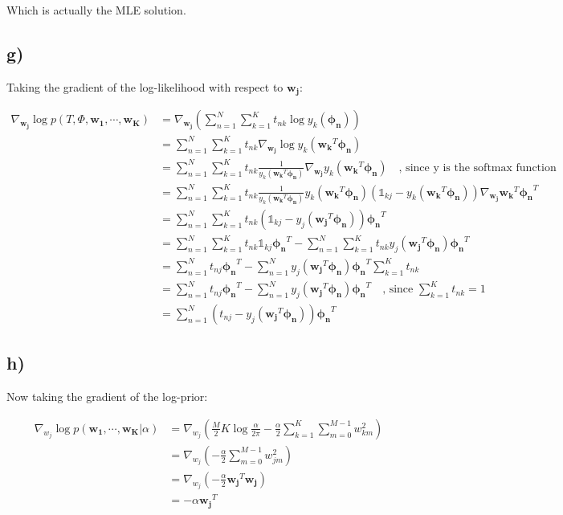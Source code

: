\documentclass[12pt,a4paper,oneside]{paper}
\begin{document}
Which is actually the MLE solution. 

\newpage
\subsection*{g)}

Taking the gradient of the log-likelihood with respect to $\bm{w_j}$:

\begin{align*}
    \nabla_{\bm{w_j}} \log p(T, \Phi, \bm{w_1}, \cdots, \bm{w_K}) &= \nabla_{\bm{w_j}} \left(\sum_{n=1}^{N} \sum_{k=1}^{K} t_{nk} \log y_k(\bm{\phi_n})\right) \\
    &= \sum_{n=1}^{N} \sum_{k=1}^{K} t_{nk} \nabla_{\bm{w_j}} \log y_k(\bm{w_k}^T \bm{\phi_n}) \\
    &= \sum_{n=1}^{N} \sum_{k=1}^{K} t_{nk} \frac{1}{y_k(\bm{w_k}^T \bm{\phi_n})} \nabla_{\bm{w_j}} y_k(\bm{w_k}^T \bm{\phi_n}) \quad \text{, since y is the softmax function} \\
    &= \sum_{n=1}^{N} \sum_{k=1}^{K} t_{nk} \frac{1}{y_k(\bm{w_k}^T \bm{\phi_n})} y_k(\bm{w_k}^T \bm{\phi_n}) (\mathds{1}_{kj} - y_k(\bm{w_k}^T \bm{\phi_n})) \nabla_{\bm{w_j}} \bm{w_k}^T \bm{\phi_n}^T \\
    &= \sum_{n=1}^{N} \sum_{k=1}^{K} t_{nk} (\mathds{1}_{kj} - y_j(\bm{w_j}^T \bm{\phi_n})) \bm{\phi_n}^T \\
    &= \sum_{n=1}^{N} \sum_{k=1}^{K} t_{nk} \mathds{1}_{kj} \bm{\phi_n}^T - \sum_{n=1}^{N} \sum_{k=1}^{K} t_{nk} y_j(\bm{w_j}^T \bm{\phi_n}) \bm{\phi_n}^T \\
    &= \sum_{n=1}^{N} t_{nj} \bm{\phi_n}^T - \sum_{n=1}^{N} y_j(\bm{w_j}^T \bm{\phi_n}) \bm{\phi_n}^T \sum_{k=1}^{K} t_{nk} \\
    &= \sum_{n=1}^{N} t_{nj} \bm{\phi_n}^T - \sum_{n=1}^{N} y_j(\bm{w_j}^T \bm{\phi_n}) \bm{\phi_n}^T \quad \text{, since } \sum_{k=1}^{K} t_{nk} = 1 \\
    &= \sum_{n=1}^{N} (t_{nj} - y_j(\bm{w_j}^T \bm{\phi_n})) \bm{\phi_n}^T
\end{align*}

\newpage
\subsection*{h)}

Now taking the gradient of the log-prior:

\begin{align*}
    \nabla_{w_j} \log p(\bm{w_1}, \cdots, \bm{w_K} | \alpha) &= \nabla_{w_j} \left(\frac{M}{2} K \log \frac{\alpha}{2\pi} - \frac{\alpha}{2} \sum_{k=1}^{K} \sum_{m=0}^{M - 1} w_{km}^2\right) \\
    &= \nabla_{w_j} \left(- \frac{\alpha}{2} \sum_{m=0}^{M - 1} w_{jm}^2\right) \\
    &= \nabla_{w_j} \left(- \frac{\alpha}{2} \bm{w_j}^T \bm{w_j}\right) \\
    &= - \alpha \bm{w_j}^T
\end{align*}
\end{document}
